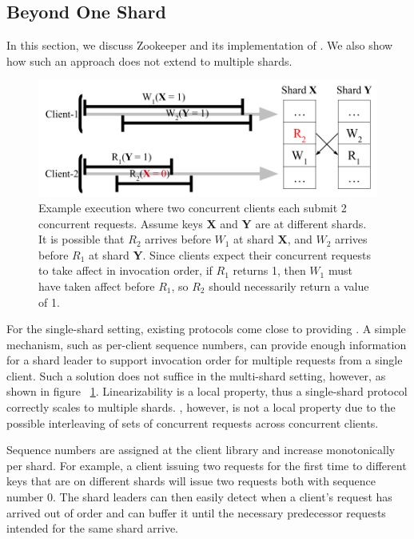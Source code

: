 \subsection{\MDL{} Beyond One Shard}
\label{sec:mdl:zookeeper}

In this section, we discuss Zookeeper and its implementation of \SDL{}.
We also show how such an approach does not extend to multiple shards.

\begin{figure}[!htb]
    \includegraphics[scale=.45]{somet.png}
    \caption{Example execution where two concurrent clients each submit 2 concurrent requests. Assume keys \textbf{X} and \textbf{Y} are at different shards. It is possible that $R_2$ arrives before $W_1$ at shard \textbf{X}, and $W_2$ arrives before $R_1$ at shard \textbf{Y}. Since clients expect their concurrent requests to take affect in invocation order, if $R_1$ returns 1, then $W_1$ must have taken affect before $R_1$, so $R_2$ should necessarily return a value of 1.}
    \label{fig:concurrentbatches}
\end{figure}

For the single-shard setting, existing protocols come close to providing \MDL{}. A simple mechanism, such as per-client sequence numbers, can provide enough information for a shard leader to support invocation order for multiple requests from a single client. Such a solution does not suffice in the multi-shard setting, however, as shown in figure ~\ref{fig:concurrentbatches}. Linearizability is a local property, thus a single-shard protocol correctly scales to multiple shards. \MDL{}, however, is not a local property due to the possible interleaving of sets of concurrent requests across concurrent clients.

Sequence numbers are assigned at the client library 
and increase monotonically per shard. For example, a client issuing two requests for the first time to different keys that are on different shards will issue two requests both with sequence number 0. The shard leaders can then easily detect when a client's request
has arrived out of order and can buffer it until the necessary predecessor requests intended for the same shard arrive.
